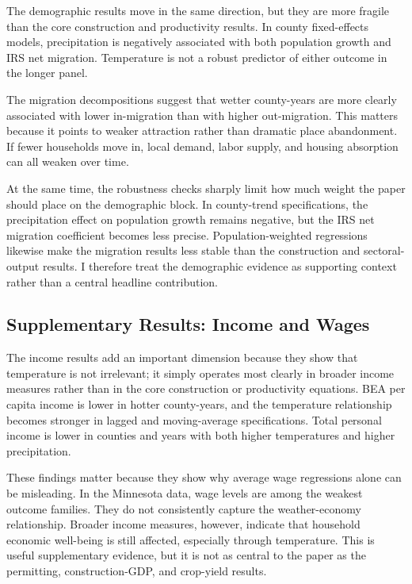 \documentclass[12pt]{article}
\begin{document}
The demographic results move in the same direction, but they are more fragile than the core construction and productivity results. In county fixed-effects models, precipitation is negatively associated with both population growth and IRS net migration. Temperature is not a robust predictor of either outcome in the longer panel.

The migration decompositions suggest that wetter county-years are more clearly associated with lower in-migration than with higher out-migration. This matters because it points to weaker attraction rather than dramatic place abandonment. If fewer households move in, local demand, labor supply, and housing absorption can all weaken over time.

At the same time, the robustness checks sharply limit how much weight the paper should place on the demographic block. In county-trend specifications, the precipitation effect on population growth remains negative, but the IRS net migration coefficient becomes less precise. Population-weighted regressions likewise make the migration results less stable than the construction and sectoral-output results. I therefore treat the demographic evidence as supporting context rather than a central headline contribution.

\subsection{Supplementary Results: Income and Wages}

The income results add an important dimension because they show that temperature is not irrelevant; it simply operates most clearly in broader income measures rather than in the core construction or productivity equations. BEA per capita income is lower in hotter county-years, and the temperature relationship becomes stronger in lagged and moving-average specifications. Total personal income is lower in counties and years with both higher temperatures and higher precipitation.

These findings matter because they show why average wage regressions alone can be misleading. In the Minnesota data, wage levels are among the weakest outcome families. They do not consistently capture the weather-economy relationship. Broader income measures, however, indicate that household economic well-being is still affected, especially through temperature. This is useful supplementary evidence, but it is not as central to the paper as the permitting, construction-GDP, and crop-yield results.
\end{document}
